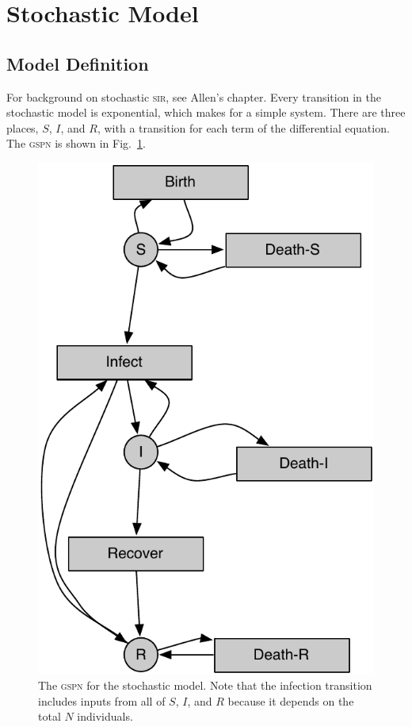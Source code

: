 \documentclass{article}
\newcommand{\sir}{\textsc{sir}\xspace}
\newcommand{\gspn}{\textsc{gspn}\xspace}
\begin{document}
\section{Stochastic Model}
\subsection{Model Definition}
For background on stochastic \sir, see Allen's chapter\cite{Allen:2008ma}.
Every transition in the stochastic model is exponential, which makes for
a simple system. There are three places, $S$, $I$, and $R$, with a transition
for each term of the differential equation. The \gspn is shown in Fig.~\ref{fig:sirgspn}.
\begin{figure}
\centerline{\includegraphics[scale=0.35]{sirexpgspn}}
\caption{The \gspn for the stochastic model. Note that the infection
transition includes inputs from all of $S$, $I$, and $R$ because it depends
on the total $N$ individuals.\label{fig:sirgspn}}
\end{figure}
\end{document}
